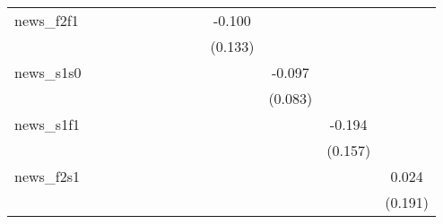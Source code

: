 {\begin{tabular}{l*{12}{c}}
\addlinespace
news\_f2f1   &                     &                     &                     &                     &                     &                     &                     &                     &      -0.100         &                     &                     &                     \\
            &                     &                     &                     &                     &                     &                     &                     &                     &     (0.133)         &                     &                     &                     \\
\addlinespace
news\_s1s0   &                     &                     &                     &                     &                     &                     &                     &                     &                     &      -0.097         &                     &                     \\
            &                     &                     &                     &                     &                     &                     &                     &                     &                     &     (0.083)         &                     &                     \\
\addlinespace
news\_s1f1   &                     &                     &                     &                     &                     &                     &                     &                     &                     &                     &      -0.194         &                     \\
            &                     &                     &                     &                     &                     &                     &                     &                     &                     &                     &     (0.157)         &                     \\
\addlinespace
news\_f2s1   &                     &                     &                     &                     &                     &                     &                     &                     &                     &                     &                     &       0.024         \\
            &                     &                     &                     &                     &                     &                     &                     &                     &                     &                     &                     &     (0.191)         \\

\end{tabular}}
